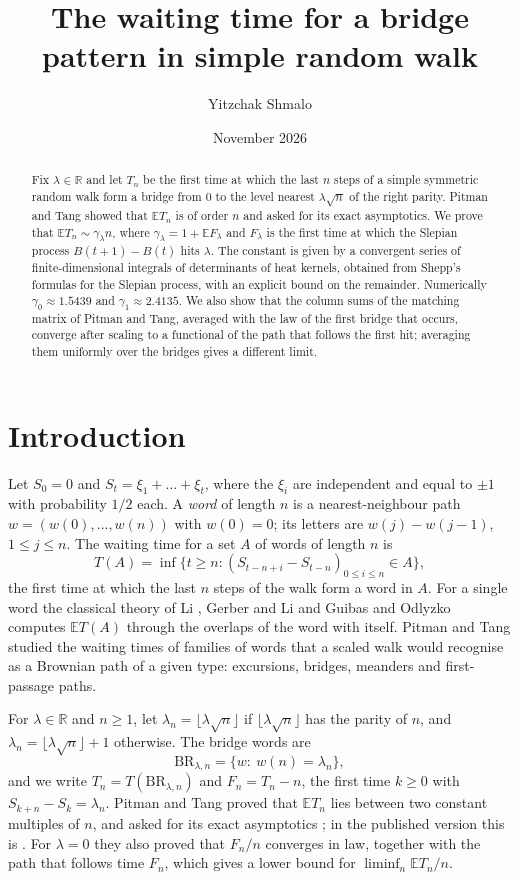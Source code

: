\documentclass[11pt]{amsart}
\title[Waiting for a bridge pattern]{The waiting time for a bridge pattern in simple random walk}
\author{Yitzchak Shmalo}
\date{November 2026}
\theoremstyle{remark}
\numberwithin{equation}{section}
\newcommand{\EE}{\mathbb{E}}
\newcommand{\R}{\mathbb{R}}
\newcommand{\BR}{\mathrm{BR}}
\begin{document}
\begin{abstract}
Fix $\lambda\in\R$ and let $T_n$ be the first time at which the last $n$ steps of a simple symmetric random walk form a bridge from $0$ to the level nearest $\lambda\sqrt n$ of the right parity. Pitman and Tang showed that $\EE T_n$ is of order $n$ and asked for its exact asymptotics. We prove that $\EE T_n\sim\gamma_\lambda n$, where $\gamma_\lambda=1+\EE F_\lambda$ and $F_\lambda$ is the first time at which the Slepian process $B(t+1)-B(t)$ hits $\lambda$. The constant is given by a convergent series of finite-dimensional integrals of determinants of heat kernels, obtained from Shepp's formulas for the Slepian process, with an explicit bound on the remainder. Numerically $\gamma_0\approx1.5439$ and $\gamma_1\approx2.4135$. We also show that the column sums of the matching matrix of Pitman and Tang, averaged with the law of the first bridge that occurs, converge after scaling to a functional of the path that follows the first hit; averaging them uniformly over the bridges gives a different limit.
\end{abstract}
\maketitle

\section{Introduction}\label{sec:intro}

Let $S_0=0$ and $S_t=\xi_1+\dots+\xi_t$, where the $\xi_i$ are independent and equal to $\pm1$ with probability $1/2$ each. A \emph{word} of length $n$ is a nearest-neighbour path $w=(w(0),\dots,w(n))$ with $w(0)=0$; its letters are $w(j)-w(j-1)$, $1\le j\le n$. The waiting time for a set $A$ of words of length $n$ is
\[
T(A)=\inf\bigl\{t\ge n:(S_{t-n+i}-S_{t-n})_{0\le i\le n}\in A\bigr\},
\]
the first time at which the last $n$ steps of the walk form a word in $A$. For a single word the classical theory of Li \cite{Li}, Gerber and Li \cite{GL} and Guibas and Odlyzko \cite{GO} computes $\EE T(A)$ through the overlaps of the word with itself. Pitman and Tang \cite{PT} studied the waiting times of families of words that a scaled walk would recognise as a Brownian path of a given type: excursions, bridges, meanders and first-passage paths.

For $\lambda\in\R$ and $n\ge1$, let $\lambda_n=\lfloor\lambda\sqrt n\rfloor$ if $\lfloor\lambda\sqrt n\rfloor$ has the parity of $n$, and $\lambda_n=\lfloor\lambda\sqrt n\rfloor+1$ otherwise. The bridge words are
\[
\BR_{\lambda,n}=\{w:\ w(n)=\lambda_n\},
\]
and we write $T_n=T(\BR_{\lambda,n})$ and $F_n=T_n-n$, the first time $k\ge0$ with $S_{k+n}-S_k=\lambda_n$. Pitman and Tang \cite[Theorem~1.8]{PT} proved that $\EE T_n$ lies between two constant multiples of $n$, and asked for its exact asymptotics \cite[Open problem~2.3]{PT}; in the published version this is \cite[Open Problem~1]{PTpub}. For $\lambda=0$ they also proved \cite[Proposition~2.4]{PT} that $F_n/n$ converges in law, together with the path that follows time $F_n$, which gives a lower bound for $\liminf_n\EE T_n/n$.
\end{document}
